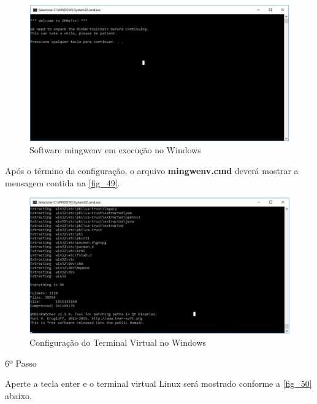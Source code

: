 \documentclass[
12pt,				%
openright,			%
oneside,			%
a4paper,			%
brazil,				%
]{abntex2}
\begin{document}
{\begin{anexosenv}
	                \begin{figure} [H]
		                \centering
		                \includegraphics[scale=.35]{figuras/aneB/48MingwenvEmEspera}
		                \caption{\label{fig_48}Software mingwenv em execução no Windows}
	                \end{figure}
	                
	                \par Após o término da configuração, o arquivo \textbf{mingwenv.cmd} deverá mostrar a mensagem contida na \autoref{fig_49}.
		            
	                \begin{figure} [H]
		                \centering
		                \includegraphics[scale=.32]{figuras/aneB/49ConfiguracaoDoTerminalLinuxNoWindows}
		                \caption{\label{fig_49}Configuração do Terminal Virtual no Windows}
	                \end{figure}
                    
            	
            	    \begin{description}
		                \item[6º Passo]
		            \end{description}
		            \par Aperte a tecla enter e o terminal virtual Linux será mostrado conforme a \autoref{fig_50} abaixo.
		            

\end{anexosenv}}
\end{document}
